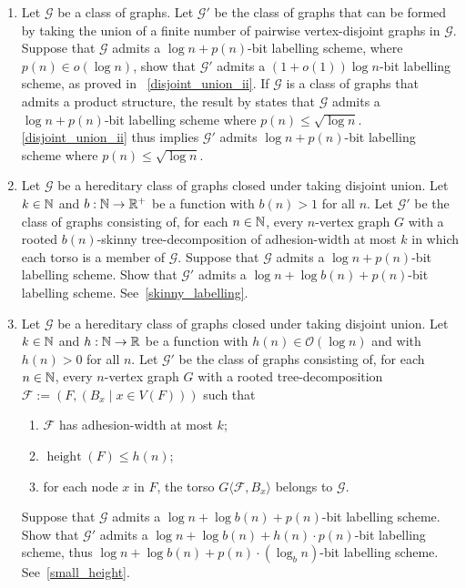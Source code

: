 \documentclass{patmorin}
\renewcommand{\le}{\leqslant}
\renewcommand{\leq}{\leqslant}
\newcommand{\torso}[2]{{#1}\langle{#2}\rangle}
\DeclareMathOperator{\height}{height}
\newcommand{\Oh}{\calO}
\newcommand{\calF}{\mathcal{F}}
\newcommand{\calG}{\mathcal{G}}
\newcommand{\calO}{\mathcal{O}}
\begin{document}
\begin{enumerate}[label=\rm(2\alph*)]
\item \label{step:union-closed}
Let $\calG$ be a class of graphs.
Let $\calG'$ be the class of graphs that can be formed by taking the union of a finite number of pairwise vertex-disjoint graphs in $\calG$.
    Suppose that $\calG$ admits a $\log n + p(n)$-bit labelling scheme, where $p(n)\in o(\log n)$, show that $\calG'$ admits a $(1+o(1))\log n$-bit labelling scheme, as proved in ~\cref{disjoint_union_ii}.    If  $\calG$ is a class of graphs that admits a product structure, the result by \citet{dujmovic.esperet.ea:adjacency} states that $\calG$ admits a $\log n + p(n)$-bit labelling scheme where $p(n)\leq \sqrt{\log n}$. \cref{disjoint_union_ii} thus implies $\calG'$  admits $\log n + p(n)$-bit labelling scheme where $p(n)\leq \sqrt{\log n}$.
    
\item \label{step:skinny-tree-decomposition}
Let $\calG$ be a hereditary class of graphs closed under taking disjoint union.
    Let $k\in\mathbb{N}$ and $b:\mathbb{N}\to\mathbb{R}^+$ be a function with $b(n)>1$ for all $n$.
    Let $\calG'$ be the class of graphs consisting of, for each $n\in\mathbb{N}$, every $n$-vertex graph $G$ with a rooted $b(n)$-skinny tree-decomposition of adhesion-width at most $k$ in which each torso is a member of $\calG$.
    Suppose that $\calG$ admits a $\log n + p(n)$-bit labelling scheme. 
    Show that $\calG'$ admits a $\log n +\log b(n) + p(n)$-bit labelling scheme. See~\cref{skinny_labelling}.
\item \label{step:short-tree-decompositions}
Let $\calG$ be a hereditary class of graphs closed under taking disjoint union.
Let $k\in\mathbb{N}$ and  $h:\mathbb{N}\to\mathbb{R}$ be a function with $h(n)\in \Oh(\log n)$ and with $h(n)>0$ for all $n$.
Let $\calG'$ be the class of graphs consisting of, for each $n\in\mathbb{N}$, every $n$-vertex graph $G$ with a rooted tree-decomposition $\calF:=(F,(B_x \mid x\in V(F)))$ such that
    \begin{enumerate}[nosep,nolistsep,label=(\rm{\roman*)}]
      \item $\calF$ has adhesion-width at most $k$;
      \item $\height(F)\le h(n)$;
      \item for each node $x$ in $F$, the torso $\torso{G}{\calF,B_x}$ belongs to $\calG$.
    \end{enumerate}
    Suppose that $\calG$ admits a $\log n +\log b(n) + p(n)$-bit labelling scheme.
    Show that $\calG'$ admits a $\log n +\log b(n) + h(n)\cdot p(n)$-bit labelling scheme, thus $\log n + \log b(n) + p(n)\cdot(\log_b n)$-bit labelling scheme. See~\cref{small_height}.
\end{enumerate}
\end{document}
